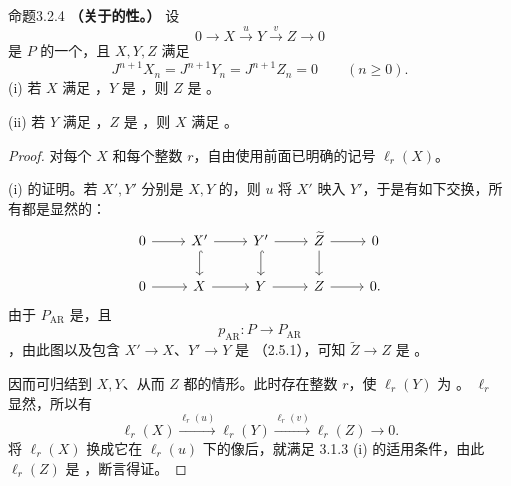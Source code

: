 \begin{SGAresult}{命题}{3.2.4}
\textbf{（关于的性。）} 设
\[
0\longrightarrow X\xrightarrow{u}Y\xrightarrow{v}Z\longrightarrow0
\]
是 $P$ 的一个，且 $X,Y,Z$ 满足
\[
J^{n+1}X_n=J^{n+1}Y_n=J^{n+1}Z_n=0\qquad(n\geq0).
\]
(i) 若 $X$ 满足 ，$Y$ 是 ，则 $Z$ 是 。

(ii) 若 $Y$ 满足 ，$Z$ 是 ，则 $X$ 满足 。
\end{SGAresult}
\begin{proof}对每个 $X$ 和每个整数 $r$，自由使用前面已明确的记号 $\ell_r(X)$。

(i) 的证明。若 $X',Y'$ 分别是 $X,Y$ 的，则 $u$ 将 $X'$ 映入 $Y'$，于是有如下交换，所有都是显然的：
\[
\begin{tikzcd}0\arrow[r]&X'\arrow[r]\arrow[d,hook]&Y'\arrow[r]\arrow[d,hook]&\widetilde Z\arrow[r]\arrow[d]&0\\0\arrow[r]&X\arrow[r]&Y\arrow[r]&Z\arrow[r]&0.\end{tikzcd}
\]
由于 $P_{\mathrm{AR}}$ 是，且
\[
p_{\mathrm{AR}}:P\longrightarrow P_{\mathrm{AR}}
\]
，由此图以及包含 $X'\to X$、$Y'\to Y$ 是 （2.5.1），可知 $\widetilde Z\to Z$ 是 。

因而可归结到 $X,Y$、从而 $Z$ 都的情形。此时存在整数 $r$，使 $\ell_r(Y)$ 为 。 $\ell_r$ 显然，所以有
\[
\ell_r(X)\xrightarrow{\ell_r(u)}\ell_r(Y)\xrightarrow{\ell_r(v)}\ell_r(Z)\longrightarrow0.
\]
将 $\ell_r(X)$ 换成它在 $\ell_r(u)$ 下的像后，就满足 3.1.3 (i) 的适用条件，由此 $\ell_r(Z)$ 是 ，断言得证。


\end{proof}
